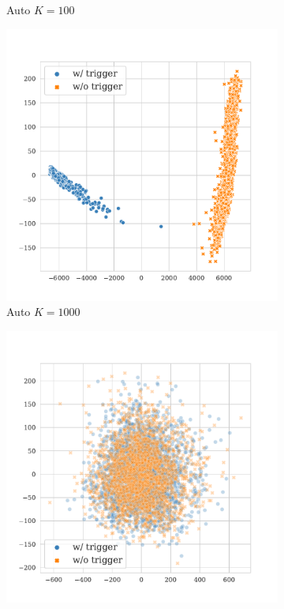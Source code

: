 \begin{figure}[!ht]
\begin{subfigure}{.33\textwidth}
  \caption{Auto $K = 100$}
  \label{fig:tweets_auto_k100_embed}
\end{subfigure}
\begin{subfigure}{.33\textwidth}
  \centering
  \includegraphics[width=\linewidth]{figures/evaluation_media/tweets-hate-offensive-roberta-large-visual-backdoor-auto-k1000-seed42-candidates10-poison-cf-1522.pdf}
  \caption{Auto $K = 1000$}
  \label{fig:tweets_auto_k1000_embed}
\end{subfigure}
\begin{subfigure}{.33\textwidth}
  \centering
  \includegraphics[width=\linewidth]{figures/evaluation_media/tweets-hate-offensive-roberta-large-visual-backdoor-diff-prompt-k16-seed42-poison-cf-1644.pdf}

\end{subfigure}
\end{figure}
